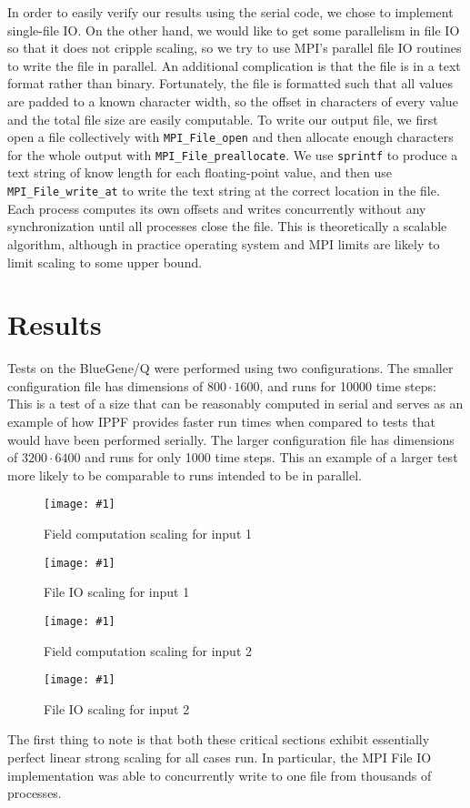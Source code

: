 \documentclass[twocolumn]{article}
\newcommand{\myimage}[3]{
\begin{figure}[!ht]
\caption{#2}
\label{#3}
\texttt{[image: \#1]}
\end{figure}
}
\begin{document}
In order to easily verify our results using the serial code,
we chose to implement single-file IO.
On the other hand, we would like to get some parallelism in
file IO so that it does not cripple scaling, so we try to use
MPI's parallel file IO routines to write the file in parallel.
An additional complication is that the file is in a text format
rather than binary.
Fortunately, the file is formatted such that all values are
padded to a known character width, so the offset in characters
of every value and the total file size are easily computable.
To write our output file, we first open a file collectively
with \texttt{MPI\_File\_open} and then 
allocate enough characters for the whole output with
\texttt{MPI\_File\_preallocate}.
We use
\texttt{sprintf} to produce a text string of know length for
each floating-point value, and then use
\texttt{MPI\_File\_write\_at} to write the text string at
the correct location in the file.
Each process computes its own offsets and writes concurrently
without any synchronization until all processes close the file.
This is theoretically a scalable algorithm, although in practice
operating system and MPI limits are likely to limit scaling
to some upper bound.

\section{Results}

Tests on the BlueGene/Q were performed using two configurations.
The smaller configuration file has dimensions of $800 \cdot 1600$,
and runs for 10000 time steps:\\

This is a test of a size that can be reasonably computed in serial
and serves as an example of how IPPF provides faster run times when
compared to tests that would have been performed serially.
The larger configuration file has dimensions of $3200 \cdot 6400$
and runs for only 1000 time steps. This an example of a larger
test more likely to be comparable to runs intended to be in parallel.


\myimage{one_calc.png}{Field computation scaling for input 1}{fig:calc1}
\myimage{one_file.png}{File IO scaling for input 1}{fig:file1}
\myimage{two_calc.png}{Field computation scaling for input 2}{fig:calc2}
\myimage{two_file.png}{File IO scaling for input 2}{fig:file2}

The first thing to note is that both these critical sections exhibit
essentially perfect linear strong scaling for all cases run.
In particular, the MPI File IO implementation was able to concurrently
write to one file from thousands of processes.
\end{document}
